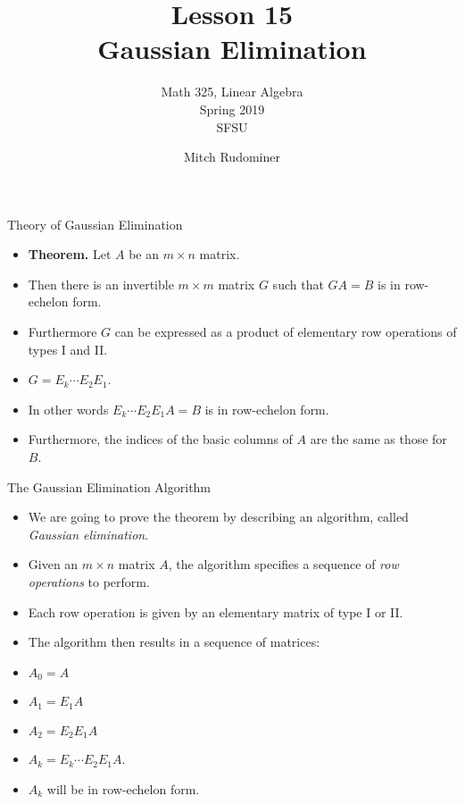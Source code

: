 \documentclass{beamer}
\title{Lesson 15 \\ Gaussian Elimination}
\subtitle{Math 325, Linear Algebra \\ Spring 2019 \\ SFSU}
\author{Mitch Rudominer}
\date{}
\begin{document}
\begin{frame}
  \titlepage
\end{frame}


\begin{frame}{Theory of Gaussian Elimination}

\begin{itemize}
\item \textbf{Theorem.} Let $A$ be an $m\times n$ matrix.
\item Then there is an invertible $m\times m$ matrix $G$ such that
$GA = B$ is in row-echelon form.
\item Furthermore $G$ can be expressed as a product of elementary row operations
of types I and II.
\item $G = E_k \cdots E_2 E_1$.
\item In other words $E_k \cdots E_2 E_1 A = B$ is in row-echelon form.
\item Furthermore, the indices of the basic columns of $A$ are the same as those for $B$.
\end{itemize}
\end{frame}


\begin{frame}{The Gaussian Elimination Algorithm}

\begin{itemize}
\item We are going to prove the theorem by describing an algorithm,
called \emph{Gaussian elimination}.
\item Given an $m\times n$ matrix $A$, the algorithm specifies a
sequence of \emph{row operations} to perform.
\item Each row operation is given by an elementary matrix of type I or II.
\item The algorithm then results in a sequence of matrices:
\item $A_0 = A$
\item $A_1 = E_1 A$
\item $A_2 = E_2 E_1 A$
\item $A_k = E_k \cdots E_2 E_1 A$.
\item $A_k$ will be in row-echelon form.
\end{itemize}
\end{frame}

\end{document}
